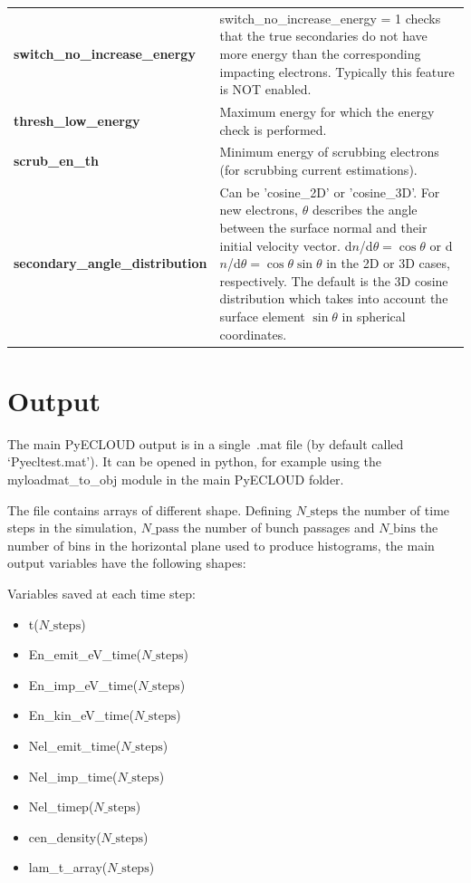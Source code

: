 \documentclass[a4paper,12pt]{article}
\begin{document}
\begin{longtable}{p{}p{}}
\hline\endfirsthead\hline\endhead\rowcolor{Gray}
\multicolumn{2}{p{.97\textwidth}}{
\textbf{Other parameters}}\\ \hline
\textbf{switch\_no\_increase\_energy}&	switch\_no\_increase\_energy = 1 checks that the true secondaries do not have more energy than the corresponding impacting electrons.
Typically this feature is NOT enabled.\\ \hline
\textbf{thresh\_low\_energy}&	Maximum energy for which the energy check is performed.\\ \hline
\textbf{scrub\_en\_th}&	Minimum energy of scrubbing electrons (for scrubbing current estimations).\\
\hline
\textbf{secondary\_angle\_distribution} & Can be 'cosine\_2D' or 'cosine\_3D'.
    For new electrons, $\theta$ describes the angle between the surface normal and their initial velocity vector.
    d$n$/d$\theta=\cos\theta$ or d$n$/d$\theta=\cos\theta\sin\theta$ in the 2D or 3D cases, respectively.
The default is the 3D cosine distribution which takes into account the surface element $\sin\theta$ in spherical coordinates.
\\ \hline
\end{longtable}


\newpage

\section{Output}
The main PyECLOUD output is in a single~.mat file (by default called `Pyecltest.mat'). It can be opened in python, for example using the myloadmat\_to\_obj module in the main PyECLOUD folder.

The file contains arrays of different shape. Defining $N\_{\mathrm{steps}}$ the number of time steps in the simulation, $N\_{\mathrm{pass}}$ the number of bunch passages and $N\_{\mathrm{bins}}$ the number of bins in the horizontal plane used to produce histograms, the main output variables have the following shapes: \newline

Variables saved at each time step:
\begin{itemize}
\item t($N\_{\mathrm{steps}}$)
\item En\_emit\_eV\_time($N\_{\mathrm{steps}}$)
\item En\_imp\_eV\_time($N\_{\mathrm{steps}}$)
\item En\_kin\_eV\_time($N\_{\mathrm{steps}}$)
\item Nel\_emit\_time($N\_{\mathrm{steps}}$)
\item Nel\_imp\_time($N\_{\mathrm{steps}}$)
\item Nel\_timep($N\_{\mathrm{steps}}$)
\item cen\_density($N\_{\mathrm{steps}}$)
\item lam\_t\_array($N\_{\mathrm{steps}}$)
\end{itemize}
\end{document}
